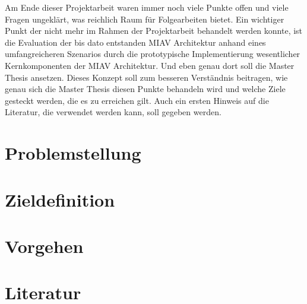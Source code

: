 \documentclass[12pt,headsepline,a4paper,bibtotoc,liststotoc,DIV12,BCOR12mm]{scrartcl}
\begin{document}
  Am Ende dieser Projektarbeit waren immer noch viele Punkte offen und viele Fragen ungeklärt, was reichlich Raum für Folgearbeiten bietet. Ein wichtiger Punkt der nicht mehr im Rahmen der Projektarbeit behandelt werden konnte, ist die Evaluation der bis dato entstanden MIAV Architektur anhand eines umfangreicheren Szenarios durch die prototypische Implementierung wesentlicher Kernkomponenten der MIAV Architektur. Und eben genau dort soll die Master Thesis ansetzen. Dieses Konzept soll zum besseren Verständnis beitragen, wie genau sich die Master Thesis diesen Punkte behandeln wird und welche Ziele gesteckt werden, die es zu erreichen gilt. Auch ein ersten Hinweis auf die Literatur, die verwendet werden kann, soll gegeben werden.


\section{Problemstellung} %
\label{sec:problemstellung}

  


\section{Zieldefinition} %
\label{sec:zieldefinition}


\section{Vorgehen} %
\label{sec:vorgehen}


\section{Literatur} %
\label{sec:literatur}


\newpage

% 


\end{document}
